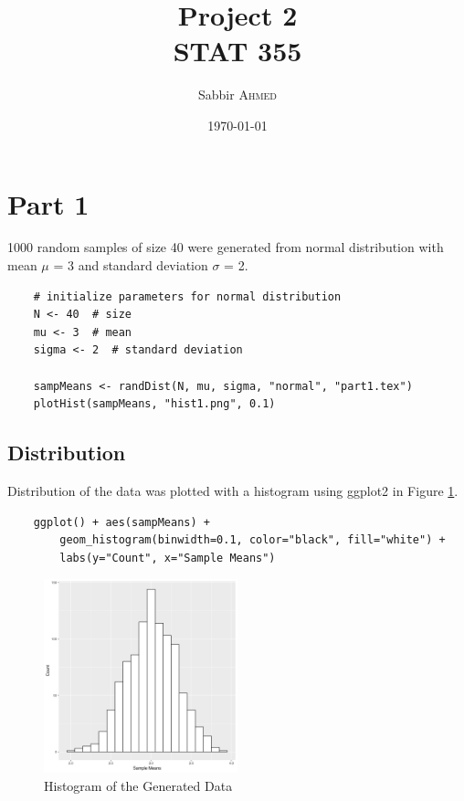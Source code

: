 \documentclass[paper=letter, fontsize=11pt]{article}
\title{Project 2 \\ STAT 355}  %
\author{Sabbir \textsc{Ahmed}}  %
\date{\today}  %
\begin{document}
    \maketitle %

    \section{Part 1}
        1000 random samples of size 40 were generated from normal distribution with mean $\mu$ = 3 and standard deviation $\sigma$ = 2.

\begin{lstlisting}
    # initialize parameters for normal distribution
    N <- 40  # size
    mu <- 3  # mean
    sigma <- 2  # standard deviation

    sampMeans <- randDist(N, mu, sigma, "normal", "part1.tex")
    plotHist(sampMeans, "hist1.png", 0.1)
\end{lstlisting}

        

        \subsection{Distribution}
            Distribution of the data was plotted with a histogram using ggplot2 in Figure \ref{fig:hist1}.
\begin{lstlisting}
    ggplot() + aes(sampMeans) + 
        geom_histogram(binwidth=0.1, color="black", fill="white") +
        labs(y="Count", x="Sample Means")
\end{lstlisting}

            \begin{figure}[!h]
                \begin{center}
                    \includegraphics[width=0.5\textwidth]{figures/hist1.png}
                    \caption{Histogram of the Generated Data} \label{fig:hist1}
                \end{center}
            \end{figure}
\end{document}
